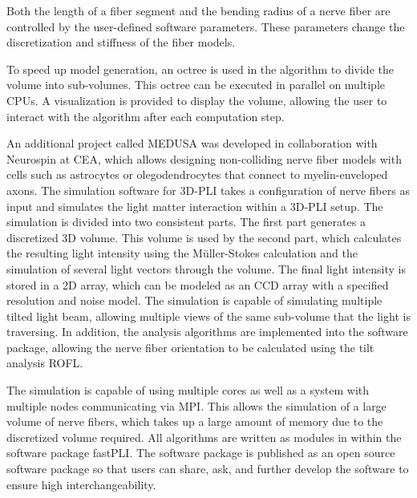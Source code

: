 Both the length of a fiber segment and the bending radius of a nerve fiber are controlled by the user-defined software parameters.
These parameters change the discretization and stiffness of the fiber models.
\par
% 
To speed up model generation, an octree is used in the algorithm to divide the volume into sub-volumes.
This octree can be executed in parallel on multiple \acp{CPU}.
A visualization is provided to display the volume, allowing the user to interact with the algorithm after each computation step.
\par
% 
An additional project called \ac{MEDUSA} was developed in collaboration with Neurospin at \ac{CEA}, which allows designing non-colliding nerve fiber models with cells such as astrocytes or olegodendrocytes that connect to myelin-enveloped axons.
% 
% 
% 
% 
The simulation software for \ac{3D-PLI} takes a configuration of nerve fibers as input and simulates the light matter interaction within a \ac{3D-PLI} setup.
The simulation is divided into two consistent parts.
The first part generates a discretized 3D volume.
This volume is used by the second part, which calculates the resulting light intensity using the M{\"u}ller-Stokes calculation and the simulation of several light vectors through the volume.
The final light intensity is stored in a 2D array, which can be modeled as an \ac{CCD} array with a specified resolution and noise model.
The simulation is capable of simulating multiple tilted light beam, allowing multiple views of the same sub-volume that the light is traversing.
In addition, the analysis algorithms are implemented into the software package, allowing the nerve fiber orientation to be calculated using the tilt analysis \ac{ROFL}.
\par
% 
The simulation is capable of using multiple cores as well as a system with multiple nodes communicating via \ac{MPI}.
This allows the simulation of a large volume of nerve fibers, which takes up a large amount of memory due to the discretized volume required.
% 
% 
% 
% 
All algorithms are written as modules in \python{} within the software package \ac{fastPLI}.
The software package is published as an open source software package so that users can share, ask, and further develop the software to ensure high interchangeability. 
